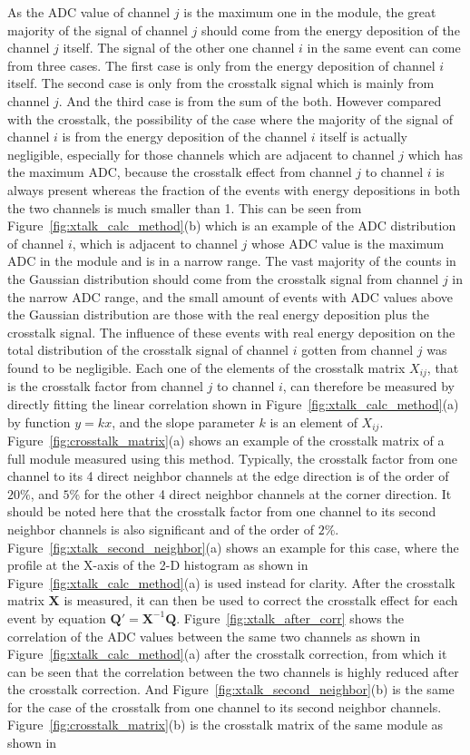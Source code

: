 \documentclass[preprint,sort&compress,12pt]{elsarticle}
\begin{document}
As the ADC value of channel $j$ is the maximum one in the module, the great majority of the signal of channel $j$ should come from the energy deposition of the channel $j$ itself. The signal of the other one channel $i$ in the same event can come from three cases. The first case is only from the energy deposition of channel $i$ itself. The second case is only from the crosstalk signal which is mainly from channel $j$. And the third case is from the sum of the both. However compared with the crosstalk, the possibility of the case where the majority of the signal of channel $i$ is from the energy deposition of the channel $i$ itself is actually negligible, especially for those channels which are adjacent to channel $j$ which has the maximum ADC, because the crosstalk effect from channel $j$ to channel $i$ is always present whereas the fraction of the events with energy depositions in both the two channels is much smaller than 1. This can be seen from Figure~\ref{fig:xtalk_calc_method}(b) which is an example of the ADC distribution of channel $i$,  which is adjacent to channel $j$ whose ADC value is the maximum ADC in the module and is in a narrow range. The vast majority of the counts in the Gaussian distribution should come from the crosstalk signal from channel $j$ in the narrow ADC range, and the small amount of events with ADC values above the Gaussian distribution are those with the real energy deposition plus the crosstalk signal. The influence of these events with real energy deposition on the total distribution of the crosstalk signal of channel $i$ gotten from channel $j$ was found to be negligible. Each one of the elements of the crosstalk matrix $X_{ij}$, that is the crosstalk factor from channel $j$ to channel $i$, can therefore be measured by directly fitting the linear correlation shown in Figure~\ref{fig:xtalk_calc_method}(a) by function $y = k x$, and the slope parameter $k$ is an element of $X_{ij}$. Figure~\ref{fig:crosstalk_matrix}(a) shows an example of the crosstalk matrix of a full module measured using this method. Typically, the crosstalk factor from one channel to its 4 direct neighbor channels at the edge direction is of the order of $20\%$, and $5\%$ for the other 4 direct neighbor channels at the corner direction. It should be noted here that the crosstalk factor from one channel to its second neighbor channels is also significant and of the order of $2\%$. Figure~\ref{fig:xtalk_second_neighbor}(a) shows an example for this case, where the profile at the X-axis of the 2-D histogram as shown in Figure~\ref{fig:xtalk_calc_method}(a) is used instead for clarity. After the crosstalk matrix $\bm{X}$ is measured, it can then be used to correct the crosstalk effect for each event by equation $\bm{Q'} = \bm{X}^{-1}\bm{Q}$. Figure~\ref{fig:xtalk_after_corr} shows the correlation of the ADC values between the same two channels as shown in Figure~\ref{fig:xtalk_calc_method}(a) after the crosstalk correction, from which it can be seen that the correlation between the two channels is highly reduced after the crosstalk correction. And Figure~\ref{fig:xtalk_second_neighbor}(b) is the same for the case of the crosstalk from one channel to its second neighbor channels. Figure~\ref{fig:crosstalk_matrix}(b) is the crosstalk matrix of the same module as shown in 
\end{document}
